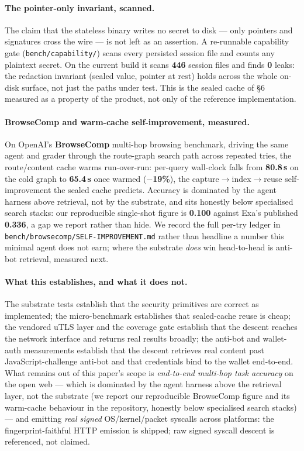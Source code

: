 \documentclass[11pt]{article}
\begin{document}
\paragraph{The pointer-only invariant, scanned.} The claim that the stateless
binary writes no secret to disk --- only pointers and signatures cross the wire ---
is not left as an assertion. A re-runnable capability gate
(\texttt{bench/capability/}) scans every persisted session file and counts any
plaintext secret. On the current build it scans \textbf{446} session files and
finds \textbf{0} leaks: the redaction invariant (sealed value, pointer at rest)
holds across the whole on-disk surface, not just the paths under test. This is the
sealed cache of \S6 measured as a property of the product, not only of the
reference implementation.

\paragraph{BrowseComp and warm-cache self-improvement, measured.} On OpenAI's
\textbf{BrowseComp} multi-hop browsing benchmark, driving the same agent and grader
through the route-graph search path across repeated tries, the route/content cache
warms run-over-run: per-query wall-clock falls from \textbf{80.8\,s} on the cold
graph to \textbf{65.4\,s} once warmed (\textbf{$-$19\%}), the
capture$\to$index$\to$reuse self-improvement the sealed cache predicts. Accuracy is
dominated by the agent harness above retrieval, not by the substrate, and sits
honestly below specialised search stacks: our reproducible single-shot figure is
\textbf{0.100} against Exa's published \textbf{0.336}, a gap we report rather than
hide. We record the full per-try ledger in
\texttt{bench/browsecomp/SELF-IMPROVEMENT.md} rather than headline a number this
minimal agent does not earn; where the substrate \emph{does} win head-to-head is
anti-bot retrieval, measured next.
\paragraph{What this establishes, and what it does not.} The substrate tests
establish that the security primitives are correct as implemented; the
micro-benchmark establishes that sealed-cache reuse is cheap; the vendored uTLS layer
and the coverage gate establish that the descent reaches the network interface and
returns real results broadly; the anti-bot and wallet-auth measurements establish that
the descent retrieves real content past JavaScript-challenge anti-bot and that
credentials bind to the wallet end-to-end. What remains out of this paper's scope is
\emph{end-to-end multi-hop task accuracy} on the open web --- which is dominated by the
agent harness above the retrieval layer, not the substrate (we report our reproducible
BrowseComp figure and its warm-cache behaviour in the repository, honestly below
specialised search stacks) --- and emitting \emph{real signed} OS/kernel/packet
syscalls across platforms: the fingerprint-faithful HTTP emission is shipped; raw
signed syscall descent is referenced, not claimed.
\end{document}
